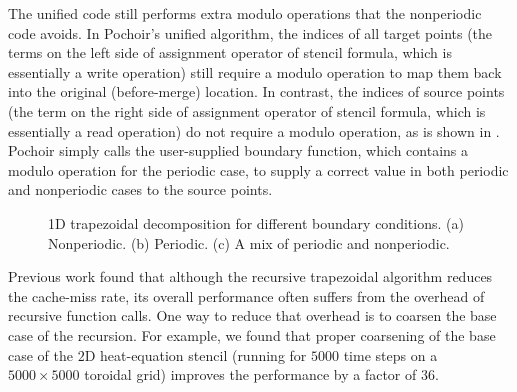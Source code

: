 The unified code still performs extra modulo operations that the
nonperiodic code avoids.  In Pochoir's unified algorithm, the indices
of all target points (the terms on the left side of assignment
operator of stencil formula, which is essentially a write operation)
still require a modulo operation to map them back into the original
(before-merge) location.  In contrast, the indices of source points
(the term on the right side of assignment operator of stencil formula,
which is essentially a read operation) do not require a modulo
operation, as is shown in .  Pochoir simply calls the
user-supplied boundary function, which contains a modulo operation for
the periodic case, to supply a correct value in both periodic and
nonperiodic cases to the source points.    

\begin{figure*}
\centering
%
%
%
%
%

\vspace{-0.2cm}
\caption{1D trapezoidal decomposition for different boundary
  conditions. (a) Nonperiodic.  (b) Periodic.  (c) A mix of periodic
  and nonperiodic.}
\label{fig:PNP}
\end{figure*}


Previous work \cite{DattaMuVo08, KamilShDa06, KamilShHu05, Nitsure06}
found that although the recursive trapezoidal algorithm reduces the
cache-miss rate, its overall performance often suffers from the
overhead of recursive function calls.  One way to reduce that overhead
is to coarsen the base case of the recursion.  For example, we found
that proper coarsening of the base case of the $2$D heat-equation
stencil (running for $5000$ time steps on a $5000 \times 5000$
toroidal grid) improves the performance by a factor of $36$.

